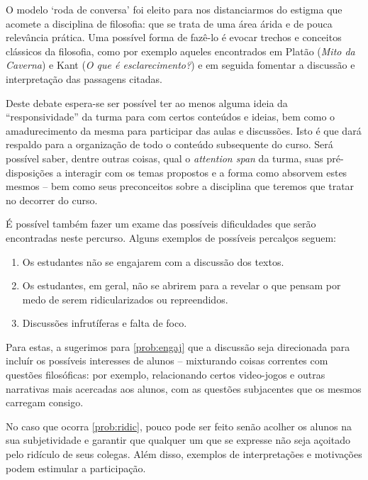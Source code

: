 \documentclass[12pt,a4paper]{article}
\begin{document}
	O modelo `roda de conversa' foi eleito 
	para nos distanciarmos do estigma que acomete a disciplina de filosofia:
	que se trata de uma área árida e de pouca relevância prática.
	Uma possível forma de fazê-lo é evocar trechos e conceitos 
	clássicos da filosofia, como por exemplo aqueles encontrados em 
	Platão (\textit{Mito da Caverna}) e Kant (\textit{O que é 
	esclarecimento?}) e em seguida fomentar a discussão e interpretação das 
	passagens citadas.

	Deste debate espera-se ser possível ter ao menos alguma ideia da 
	``responsividade'' da turma para com certos conteúdos e ideias, 
	bem como o amadurecimento da mesma para participar das aulas 
	e discussões. Isto é que dará respaldo para a organização de 
	todo o conteúdo subsequente do curso. Será possível saber, dentre 
	outras coisas, qual o \emph{attention span} da turma, suas 
	pré-disposições a interagir com os temas propostos e a forma 
	como absorvem estes mesmos -- bem como seus preconceitos sobre 
	a disciplina que teremos que tratar no decorrer do curso. 
	
	É possível também fazer um exame das possíveis dificuldades 
	que serão encontradas neste percurso. Alguns exemplos de possíveis 
	percalços seguem:

	\begin{enumerate}[label=\alph*)]
		\item	\label{prob:engaj} 
			Os estudantes não se engajarem com a discussão 
			dos textos.

		\item	\label{prob:ridic}
			Os estudantes, em geral, não se abrirem para a 
			revelar o que pensam por medo de serem ridicularizados
			ou repreendidos.

		\item	\label{prob:disc}
			Discussões infrutíferas e falta de foco.
	\end{enumerate}
	
	Para estas, a sugerimos para \ref{prob:engaj} que a discussão
	seja direcionada para incluír os possíveis interesses de alunos
	-- mixturando coisas correntes com questões filosóficas: por
	exemplo, relacionando certos video-jogos e outras narrativas 
	mais acercadas aos alunos, com as questões subjacentes que os 
	mesmos carregam consigo. 
	
	No caso que ocorra \ref{prob:ridic}, pouco pode ser feito senão
	acolher os alunos na sua subjetividade e garantir que qualquer 
	um que se expresse não seja açoitado pelo ridículo de seus 
	colegas. Além disso, exemplos de interpretações e motivações 
	podem estimular a participação.
\end{document}
